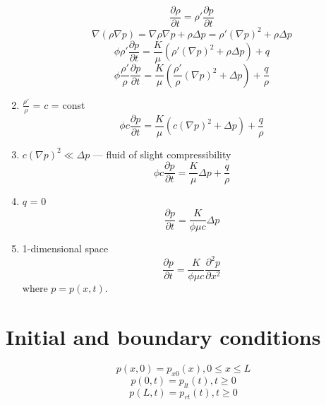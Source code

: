 \documentclass{article}
\begin{document}
\begin{enumerate}
\begin{equation}
\frac{\partial \rho}{\partial t} = \rho' \frac{\partial p}{\partial t}
\end{equation}
\begin{equation}
\nabla (\rho \nabla p) = \nabla \rho \nabla p + \rho \Delta p = \rho' (\nabla
p)^2 + \rho \Delta p
\end{equation}
\begin{equation}
\phi \rho' \frac{\partial p}{\partial t} = \frac{K}{\mu} \left(\rho' (\nabla
p)^2 + \rho \Delta p \right) + q
\end{equation}
\begin{equation}
\phi \frac{\rho'}{\rho} \frac{\partial p}{\partial t} = \frac{K}{\mu}
\left(\frac{\rho'}{\rho} (\nabla p)^2 + \Delta p \right) + \frac{q}{\rho}
\end{equation}
\item $\frac{\rho'}{\rho}$ = $c$ = const
\begin{equation}
\phi c \frac{\partial p}{\partial t} = \frac{K}{\mu} \left(c (\nabla p)^2 +
\Delta p \right) + \frac{q}{\rho}
\end{equation}
\item $c (\nabla p)^2 \ll \Delta p$ --- fluid of slight compressibility
\begin{equation}
\phi c \frac{\partial p}{\partial t} = \frac{K}{\mu} \Delta p + \frac{q}{\rho}
\end{equation}
\item $q$ = 0
\begin{equation}
\frac{\partial p}{\partial t} = \frac{K}{\phi \mu c} \Delta p
\end{equation}
\item 1-dimensional space
\begin{equation}
\frac{\partial p}{\partial t} = \frac{K}{\phi \mu c} \frac{\partial^2
p}{\partial x^2}
\end{equation}
where $p = p(x, t)$.
\end{enumerate}

\section{Initial and boundary conditions}
\begin{equation}
p(x, 0) = p_{x 0}(x), 0 \leq x \leq L
\end{equation}
\begin{equation}
p(0, t) = p_{l t}(t), t \geq 0
\end{equation}
\begin{equation}
p(L, t) = p_{r t}(t), t \geq 0
\end{equation}
\end{document}
